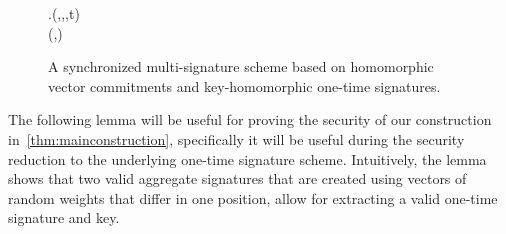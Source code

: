 \begin{figure}[p]
\begin{pchstack}
\begin{pcvstack}
{     \gets \hvc.\open(\hvcparams,,\opks,t)\\
    \pcreturn \sigma \coloneqq (\otsig,)
  }
  \pcvspace
  \pcvspace
\end{pcvstack}
\end{pchstack}
\caption{A synchronized multi-signature scheme based on homomorphic vector commitments and key-homomorphic one-time signatures.}
\label{fig:nidvconst}
\end{figure}
%
\iffalse
The following lemma will be useful for proving the security of our construction in~\autoref{thm:mainconstruction}, specifically it will be useful during the security reduction to the underlying one-time signature scheme.
Intuitively, the lemma shows that two valid aggregate signatures that are created using vectors of random weights that differ in one position, allow for extracting a valid one-time signature and key.

